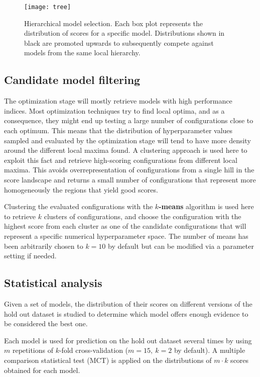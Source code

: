 \begin{figure}[here]
	\texttt{[image: tree]}
	\caption[Hierarchical model selection]{Hierarchical model selection. Each box plot represents
	the distribution of scores for a specific model. Distributions shown in black are promoted
	upwards to subsequently compete against models from the same local hierarchy.}
	\label{img:tree}
\end{figure}

\subsection{Candidate model filtering}
The optimization stage will mostly retrieve models with high performance indices. Most optimization
techniques try to find local optima, and as a consequence, they might end up testing a large number
of configurations close to each optimum. This means that the distribution of hyperparameter values
sampled and evaluated by the optimization stage will tend to have more density around the different
local maxima found. A clustering approach is used here to exploit this fact and retrieve
high-scoring configurations from different local maxima. This avoids overrepresentation of
configurations from a single hill in the score landscape and returns a small number of
configurations that represent more homogeneously the regions that yield good scores.

Clustering the evaluated configurations with the {\bf $k$-means} algorithm is used here to retrieve
$k$ clusters of configurations, and choose the configuration with the highest score from each cluster as
one of the candidate configurations that will represent a specific numerical hyperparameter space.
The number of means has been arbitrarily chosen to $k = 10$ by default but can be modified via a
parameter setting if needed.

\subsection{Statistical analysis}

Given a set of models, the distribution of their scores on different versions of the hold out
dataset is studied to determine which model offers enough evidence to be considered the best one.

Each model is used for prediction on the hold out dataset several times by using $m$ repetitions of
$k$-fold cross-validation ($m=15,~k=2$ by default). A multiple comparison statistical test (MCT) is
applied on the distributions of $m\cdot k$ scores obtained for each model.

